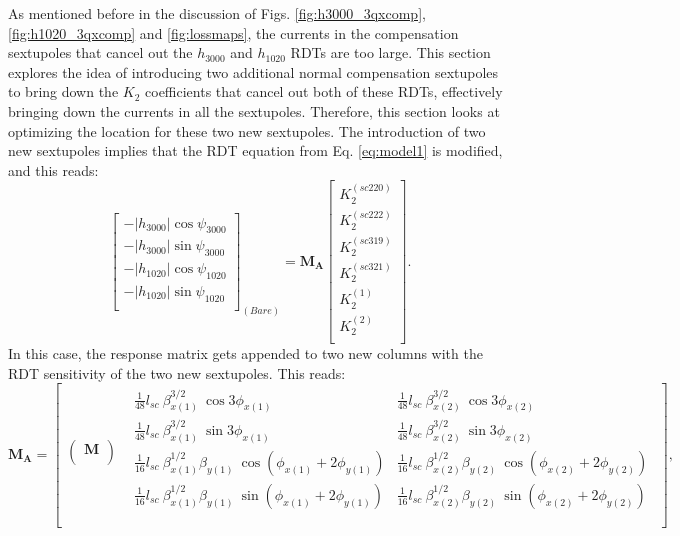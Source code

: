 As mentioned before in the discussion of Figs. \ref{fig:h3000_3qxcomp}, \ref{fig:h1020_3qxcomp} and \ref{fig:lossmaps}, the currents in the compensation sextupoles that cancel out the $h_{3000}$ and $h_{1020}$ RDTs are too large. This section explores the idea of introducing two additional normal compensation sextupoles to bring down the $K_2$ coefficients that cancel out both of these RDTs, effectively bringing down the currents in all the sextupoles. Therefore, this section looks at optimizing the location for these two new sextupoles. The introduction of two new sextupoles implies that the RDT equation from Eq. \ref{eq:model1} is modified, and this reads:
\begin{equation}
    \begin{bmatrix}
        -|h_{3000}| \cos \psi_{3000} \\
        -|h_{3000}| \sin \psi_{3000} \\
        -|h_{1020}| \cos \psi_{1020} \\
        -|h_{1020}| \sin \psi_{1020} \\
        \end{bmatrix}_{(Bare)}
         =
        \boldsymbol{M_A}
        \begin{bmatrix}
        K_2^{(sc220)} \\
        K_2^{(sc222)}\\
        K_2^{(sc319)} \\
        K_2^{(sc321)}\\
        K_2^{(1)} \\
        K_2^{(2)}\\
        \end{bmatrix}.
        \label{eq:systemadd}
\end{equation}
In this case, the response matrix gets appended to two new columns with the RDT sensitivity of the two new sextupoles. This reads:
\begin{equation}
    \boldsymbol{M_A} =
\begin{bmatrix}
\begin{pmatrix}  \boldsymbol{M} \\ \end{pmatrix} 
& \begin{matrix} \frac{1}{48} l_{sc} \: \beta^{3/2}_{x(1)} \: \cos 3\phi_{x(1)} & \frac{1}{48} l_{sc} \: \beta^{3/2}_{x(2)} \: \cos 3\phi_{x(2)} \\ 
 \frac{1}{48} l_{sc} \: \beta^{3/2}_{x(1)} \: \sin 3\phi_{x(1)} & \frac{1}{48} l_{sc} \: \beta^{3/2}_{x(2)} \: \sin 3\phi_{x(2)}  \\ 
 \frac{1}{16} l_{sc} \: \beta^{1/2}_{x(1)} \beta_{y(1)} \: \cos \left( \phi_{x(1)} + 2\phi_{y(1)} \right) &  \frac{1}{16} l_{sc} \: \beta^{1/2}_{x(2)} \beta_{y(2)} \: \cos \left( \phi_{x(2)} + 2\phi_{y(2)} \right)\\ 
 \frac{1}{16} l_{sc} \: \beta^{1/2}_{x(1)} \beta_{y(1)} \: \sin \left( \phi_{x(1)} + 2\phi_{y(1)} \right) &  \frac{1}{16} l_{sc} \: \beta^{1/2}_{x(2)} \beta_{y(2)} \: \sin \left( \phi_{x(2)} + 2\phi_{y(2)} \right)\\  
\end{matrix}\\
\end{bmatrix},
\end{equation}
